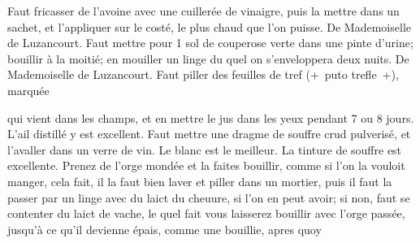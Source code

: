 \pstart%
\protect{}\protect{}
Faut fricasser de l'avoine\protect{} avec une cuiller\'{e}e de vinaigre, puis la mettre dans un sachet, et l'appliquer sur le cost\'{e}, le plus chaud que l'on puisse. De Mademoiselle de Luzancourt.\protect{}
\pend%
\pstart%
\protect{}
Faut mettre pour 1 sol de couperose\protect{} verte dans une pinte d'urine; bouillir \`{a} la moiti\'{e}; en mouiller un linge du quel on s'enveloppera deux nuits. De Mademoiselle de Luzancourt.\protect{}
\pend%
\pstart%
\protect{}
Faut piller des feuilles de tref (+~puto trefle\protect{}~+), marqu\'{e}e  \protect\rule[-3mm]{0mm}{14mm} qui vient dans les champs, et en mettre le jus dans les yeux pendant 7 ou 8 jours.
\pend%
\pstart%
\protect{}
L'ail\protect{} distill\'{e} y est excellent.
\pend%
\pstart%
\protect{}%
\protect{}
Faut mettre une dragme de souffre\protect{} crud pulveris\'{e}, et l'avaller dans un verre de vin\protect{}. Le blanc est le meilleur. La tinture de souffre\protect{} est excellente.
\pend%
\pstart%
Prenez de l'orge\protect{} mond\'{e}e et la faites bouillir, comme si l'on la vouloit manger, cela fait, il la faut bien laver et piller dans un mortier, puis il faut la passer par un linge avec du laict du cheuure\protect{}, si l'on en peut avoir; si non, faut se contenter du laict de vache\protect{}, le quel fait vous laisserez bouillir avec l'orge\protect{} pass\'{e}e, jusqu'\`{a} ce qu'il devienne \'{e}pais, comme une bouillie, apres quoy
